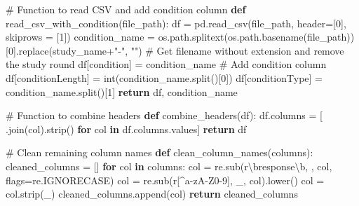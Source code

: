 \documentclass[
  letterpaper,
  DIV=11,
  numbers=noendperiod]{scrartcl}
\newenvironment{Shaded}{\begin{snugshade}}{\end{snugshade}}
\newcommand{\BuiltInTok}[1]{\textcolor[rgb]{0.00,0.23,0.31}{#1}}
\newcommand{\CommentTok}[1]{\textcolor[rgb]{0.37,0.37,0.37}{#1}}
\newcommand{\ControlFlowTok}[1]{\textcolor[rgb]{0.00,0.23,0.31}{\textbf{#1}}}
\newcommand{\DecValTok}[1]{\textcolor[rgb]{0.68,0.00,0.00}{#1}}
\newcommand{\KeywordTok}[1]{\textcolor[rgb]{0.00,0.23,0.31}{\textbf{#1}}}
\newcommand{\NormalTok}[1]{\textcolor[rgb]{0.00,0.23,0.31}{#1}}
\newcommand{\OperatorTok}[1]{\textcolor[rgb]{0.37,0.37,0.37}{#1}}
\newcommand{\PreprocessorTok}[1]{\textcolor[rgb]{0.68,0.00,0.00}{#1}}
\newcommand{\StringTok}[1]{\textcolor[rgb]{0.13,0.47,0.30}{#1}}
\newcommand{\VerbatimStringTok}[1]{\textcolor[rgb]{0.13,0.47,0.30}{#1}}
\begin{document}
\begin{Shaded}
\begin{Highlighting}[]
\CommentTok{\# Function to read CSV and add condition column}
\KeywordTok{def}\NormalTok{ read\_csv\_with\_condition(file\_path):}
\NormalTok{    df }\OperatorTok{=}\NormalTok{ pd.read\_csv(file\_path, header}\OperatorTok{=}\NormalTok{[}\DecValTok{0}\NormalTok{], skiprows }\OperatorTok{=}\NormalTok{ [}\DecValTok{1}\NormalTok{])}
\NormalTok{    condition\_name }\OperatorTok{=}\NormalTok{ os.path.splitext(os.path.basename(file\_path))[}\DecValTok{0}\NormalTok{].replace(study\_name}\OperatorTok{+}\StringTok{"{-}"}\NormalTok{, }\StringTok{""}\NormalTok{)  }\CommentTok{\# Get filename without extension and remove the study round}
\NormalTok{    df[}\StringTok{\textquotesingle{}condition\textquotesingle{}}\NormalTok{] }\OperatorTok{=}\NormalTok{ condition\_name  }\CommentTok{\# Add condition column}
\NormalTok{    df[}\StringTok{\textquotesingle{}conditionLength\textquotesingle{}}\NormalTok{] }\OperatorTok{=} \BuiltInTok{int}\NormalTok{(condition\_name.split(}\StringTok{\textquotesingle{}{-}\textquotesingle{}}\NormalTok{)[}\DecValTok{0}\NormalTok{])}
\NormalTok{    df[}\StringTok{\textquotesingle{}conditionType\textquotesingle{}}\NormalTok{] }\OperatorTok{=}\NormalTok{ condition\_name.split(}\StringTok{\textquotesingle{}{-}\textquotesingle{}}\NormalTok{)[}\DecValTok{1}\NormalTok{]}
    \ControlFlowTok{return}\NormalTok{ df, condition\_name}

\CommentTok{\# Function to combine headers}
\KeywordTok{def}\NormalTok{ combine\_headers(df):}
\NormalTok{    df.columns }\OperatorTok{=}\NormalTok{ [}\StringTok{\textquotesingle{} \textquotesingle{}}\NormalTok{.join(col).strip() }\ControlFlowTok{for}\NormalTok{ col }\KeywordTok{in}\NormalTok{ df.columns.values]}
    \ControlFlowTok{return}\NormalTok{ df}

\CommentTok{\# Clean remaining column names}
\KeywordTok{def}\NormalTok{ clean\_column\_names(columns):}
\NormalTok{    cleaned\_columns }\OperatorTok{=}\NormalTok{ []}
    \ControlFlowTok{for}\NormalTok{ col }\KeywordTok{in}\NormalTok{ columns:}
\NormalTok{        col }\OperatorTok{=}\NormalTok{ re.sub(}\VerbatimStringTok{r\textquotesingle{}}\DecValTok{\textbackslash{}b}\VerbatimStringTok{response}\DecValTok{\textbackslash{}b}\VerbatimStringTok{\textquotesingle{}}\NormalTok{, }\StringTok{\textquotesingle{}\textquotesingle{}}\NormalTok{, col, flags}\OperatorTok{=}\NormalTok{re.IGNORECASE)}
\NormalTok{        col }\OperatorTok{=}\NormalTok{ re.sub(}\VerbatimStringTok{r\textquotesingle{}}\PreprocessorTok{[\^{}a{-}zA{-}Z0{-}9]}\VerbatimStringTok{\textquotesingle{}}\NormalTok{, }\StringTok{\textquotesingle{}\_\textquotesingle{}}\NormalTok{, col).lower()}
\NormalTok{        col }\OperatorTok{=}\NormalTok{ col.strip(}\StringTok{\textquotesingle{}\_\textquotesingle{}}\NormalTok{)}
\NormalTok{        cleaned\_columns.append(col)}
    \ControlFlowTok{return}\NormalTok{ cleaned\_columns}
  

\end{Highlighting}
\end{Shaded}
\end{document}
